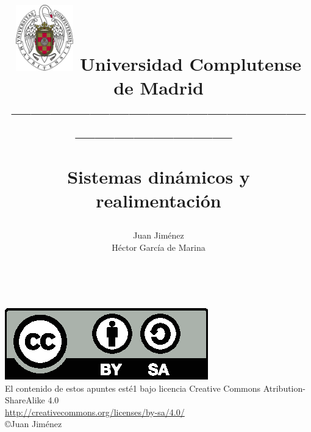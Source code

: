 \documentclass[a4paper,10pt]{book}
\begin{document}
\title{
\begin{flushleft}
\includegraphics[width=2.5cm]{ucm2.eps}
Universidad Complutense de Madrid\\
---------------------------------------------------------------------\
\end{flushleft}
Sistemas din\'amicos y realimentaci\'on}
\author{ Juan Jim\'enez \\ H\'ector Garc\'ia de Marina}

\maketitle\
\
\vspace*{\fill}

\includegraphics[scale=1]{by-sa.eps}\\
El contenido de estos apuntes est\'e1 bajo licencia Creative Commons Atribution-ShareAlike 4.0\\
\href{http://creativecommons.org/licenses/by-sa/4.0/}{http://creativecommons.org/licenses/by-sa/4.0/}\\
\copyright Juan Jim\'enez

\bigskip
\tableofcontents
\listoffigures
\listoftables







\printindex
\end{document}
